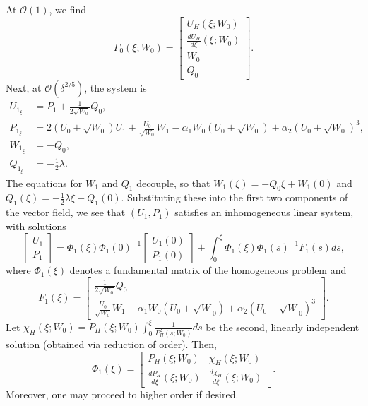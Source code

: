 \documentclass[11pt]{article}
\numberwithin{equation}{section}
\begin{document}
At $\mathcal{O}(1)$, we find
\begin{equation*}
    \Gamma_0(\xi;W_0) = 
    \begin{bmatrix}
     U_H (\xi; W_0) \\
     \frac{dU_H}{d\xi} (\xi; W_0) \\
     W_0 \\
     Q_0 
    \end{bmatrix}.
\end{equation*}
Next, at $\mathcal{O}(\delta^{2/5})$, the system is
\begin{equation}\label{eq:delta25sys}
    \begin{split}
        U_{1_\xi} &=  P_1 + \frac{1}{2\sqrt{W
    _0}} Q_0, \\
        P_{1_\xi} &= 2 (U_0 + \sqrt{W_0}) U_1 + \frac{U_0}{\sqrt{W_0}}W_1 - \alpha_1 W_0 (U_0 + \sqrt{W_0}) + \alpha_2 (U_0 + \sqrt{W_0})^3, \\
        W_{1_\xi} &= - Q_0, \\
        Q_{1_\xi} &= - \tfrac{1}{2} \lambda.
    \end{split}
\end{equation}
The equations for $W_1$ and $Q_1$ decouple, so that $W_1(\xi) =  - Q_0 \xi + W_1(0)$ and 
$Q_1(\xi) = -\tfrac{1}{2} \lambda \xi + Q_1(0)$.
Substituting these into the first two components of the vector field, we see that $(U_1,P_1)$ satisfies an inhomogeneous linear system, with solutions
\begin{equation}
    \begin{bmatrix}
        U_1 \\
        P_1
    \end{bmatrix}
    = \Phi_1(\xi) \Phi_1(0)^{-1} 
    \begin{bmatrix}
        U_1(0) \\
        P_1(0) 
    \end{bmatrix}
    + \int_0^\xi \Phi_1 (\xi) \Phi_1(s)^{-1} F_1 (s) ds,  
\end{equation}
where $\Phi_1(\xi)$ denotes a fundamental matrix of the homogeneous problem and 
\begin{equation*}
    F_1 (\xi) = 
    \begin{bmatrix}
         \frac{1}{2\sqrt{W_0}} Q_0 \\
         \frac{U_0}{\sqrt{W_0}} W_1 - \alpha_1 W_0 (U_0 + \sqrt{W}_0) + \alpha_2 (U_0+\sqrt{W}_0)^3
    \end{bmatrix}.
\end{equation*}
Let $\chi_H(\xi;W_0)=P_H(\xi;W_0) \int_0^\xi \frac{1}{P_H^2(s;W_0)} ds$ be the second, linearly independent solution (obtained via reduction of order). 
Then,
\begin{equation}
  \Phi_1(\xi) = 
  \begin{bmatrix}
      P_H(\xi;W_0)  &  \chi_H (\xi; W_0) \\
      \tfrac{dP_H}{d\xi} (\xi; W_0) &
      \tfrac{d\chi_H}{d\xi} (\xi; W_0)
  \end{bmatrix}.
\end{equation}
Moreover, one may proceed to higher order if desired.
\end{document}
